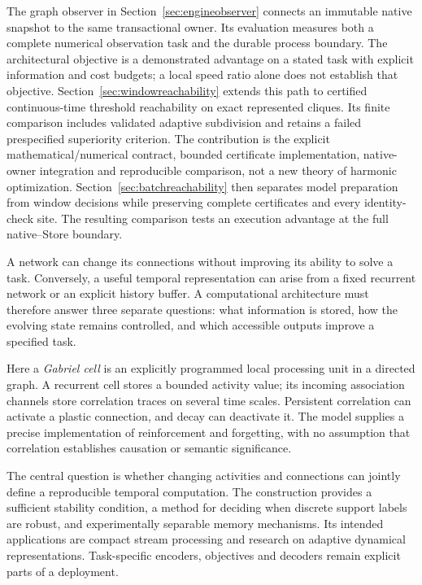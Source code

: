 \documentclass[11pt,a4paper]{article}
\theoremstyle{definition}\newtheorem{definition}[theorem]{Definition}
\begin{document}
The graph observer in Section~\ref{sec:engineobserver} connects an immutable native snapshot to the same transactional owner. Its evaluation measures both a complete numerical observation task and the durable process boundary. The architectural objective is a demonstrated advantage on a stated task with explicit information and cost budgets; a local speed ratio alone does not establish that objective. Section~\ref{sec:windowreachability} extends this path to certified continuous-time threshold reachability on exact represented cliques. Its finite comparison includes validated adaptive subdivision and retains a failed prespecified superiority criterion. The contribution is the explicit mathematical/numerical contract, bounded certificate implementation, native-owner integration and reproducible comparison, not a new theory of harmonic optimization. Section~\ref{sec:batchreachability} then separates model preparation from window decisions while preserving complete certificates and every identity-check site. The resulting comparison tests an execution advantage at the full native--Store boundary.

A network can change its connections without improving its ability to solve a task. Conversely, a useful temporal representation can arise from a fixed recurrent network or an explicit history buffer. A computational architecture must therefore answer three separate questions: what information is stored, how the evolving state remains controlled, and which accessible outputs improve a specified task.

Here a \emph{Gabriel cell} is an explicitly programmed local processing unit in a directed graph. A recurrent cell stores a bounded activity value; its incoming association channels store correlation traces on several time scales. Persistent correlation can activate a plastic connection, and decay can deactivate it. The model supplies a precise implementation of reinforcement and forgetting, with no assumption that correlation establishes causation or semantic significance.

The central question is whether changing activities and connections can jointly define a reproducible temporal computation. The construction provides a sufficient stability condition, a method for deciding when discrete support labels are robust, and experimentally separable memory mechanisms. Its intended applications are compact stream processing and research on adaptive dynamical representations. Task-specific encoders, objectives and decoders remain explicit parts of a deployment.
\end{document}
